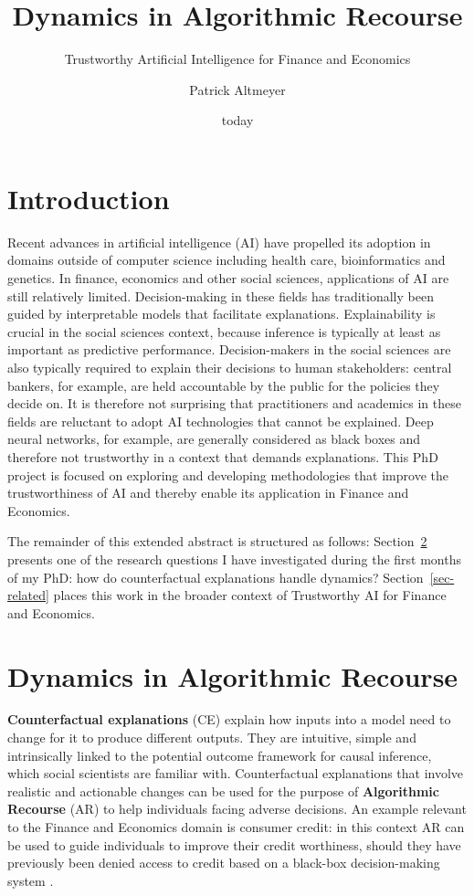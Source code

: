 \documentclass[
  sigconf]{acmart}
\author{Patrick Altmeyer}
\affiliation{%
  \institution{Delft University of Technology}
  \city{Delft}
  \country{The Netherlands}
}
\title{Dynamics in Algorithmic Recourse}
\subtitle{Trustworthy Artificial Intelligence for Finance and Economics}
\author{}
\date{today}
\begin{document}
\maketitle

\hypertarget{introduction}{%
\section{Introduction}\label{introduction}}

Recent advances in artificial intelligence (AI) have propelled its
adoption in domains outside of computer science including health care,
bioinformatics and genetics. In finance, economics and other social
sciences, applications of AI are still relatively limited.
Decision-making in these fields has traditionally been guided by
interpretable models that facilitate explanations. Explainability is
crucial in the social sciences context, because inference is typically
at least as important as predictive performance. Decision-makers in the
social sciences are also typically required to explain their decisions
to human stakeholders: central bankers, for example, are held
accountable by the public for the policies they decide on. It is
therefore not surprising that practitioners and academics in these
fields are reluctant to adopt AI technologies that cannot be explained.
Deep neural networks, for example, are generally considered as black
boxes and therefore not trustworthy in a context that demands
explanations. This PhD project is focused on exploring and developing
methodologies that improve the trustworthiness of AI and thereby enable
its application in Finance and Economics.

The remainder of this extended abstract is structured as follows:
Section~\ref{sec-main} presents one of the research questions I have
investigated during the first months of my PhD: how do counterfactual
explanations handle dynamics? Section~\ref{sec-related} places this work
in the broader context of Trustworthy AI for Finance and Economics.

\hypertarget{sec-main}{%
\section{Dynamics in Algorithmic Recourse}\label{sec-main}}

\textbf{Counterfactual explanations} (CE) explain how inputs into a
model need to change for it to produce different outputs. They are
intuitive, simple and intrinsically linked to the potential outcome
framework for causal inference, which social scientists are familiar
with. Counterfactual explanations that involve realistic and actionable
changes can be used for the purpose of \textbf{Algorithmic Recourse}
(AR) to help individuals facing adverse decisions. An example relevant
to the Finance and Economics domain is consumer credit: in this context
AR can be used to guide individuals to improve their credit worthiness,
should they have previously been denied access to credit based on a
black-box decision-making system .
\end{document}
